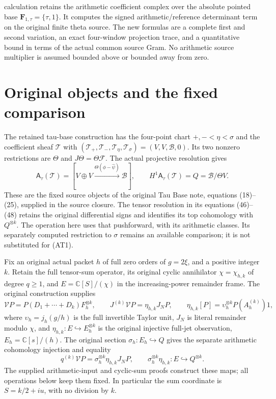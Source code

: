 \documentclass{article}
\newcommand{\C}{\mathbb C}
\begin{document}
\maketitleThis calculation retains the arithmetic coefficient complex over the
absolute pointed base $\mathbf F_{1,\tau}=\{\tau,1\}$. It computes the
signed arithmetic/reference determinant term on the original finite
theta source. The new formulas are a complete first and second variation,
an exact four-window projection trace, and a quantitative bound in terms
of the actual common source Gram. No arithmetic source multiplier is
assumed bounded above or bounded away from zero.

\section{Original objects and the fixed comparison}

The retained tau-base construction has the four-point chart
$+,-<\eta<\sigma$ and the coefficient sheaf $\mathcal T$ with
$(\mathcal T_+,\mathcal T_-,\mathcal T_\eta,\mathcal T_\sigma)
=(V,V,\mathscr B,0)$. Its two nonzero restrictions are $\Theta$ and
$J\Theta=\Theta\mathcal F$. The actual projective resolution gives
\[
 \mathsf A_\tau(\mathcal T)
 =[V\oplus V\xrightarrow{\Theta(\phi-\widehat\psi)}\mathscr B],
 \qquad H^1\mathsf A_\tau(\mathcal T)=Q=\mathscr B/\Theta V.
 \tag{AT1}
\]
These are the fixed source objects of the original Tau Base note,
equations (18)--(25), supplied in the source closure. The tensor
resolution in its equations (46)--(48) retains the original differential
signs and identifies its top cohomology with $Q^{\otimes k}$.
The operation here uses that pushforward, with its arithmetic classes.
Its separately computed restriction to $\sigma$ remains an available
comparison; it is not substituted for (AT1).

Fix an original actual packet $h$ of full zero orders of $g=2\xi$,
and a positive integer $k$. Retain the full tensor-sum operator,
its original cyclic annihilator $\chi=\chi_{h,k}$ of degree $q\ge1$,
and $E=\C[S]/(\chi)$ in the increasing-power remainder frame.
The original construction supplies
\[
 \mathcal V P=P(D_1+\cdots+D_k)F_h^{\otimes k},\qquad
 J^{(k)}\mathcal V P=\eta_{h,k}J_NP,\qquad
 \eta_{h,k}[P]=\upsilon_h^{\otimes k}P(A_h^{(k)})1,
 \tag{AT2}
\]
where $\upsilon_h=j_h(g/h)$ is the full invertible Taylor unit,
$J_N$ is literal remainder modulo $\chi$, and
$\eta_{h,k}:E\hookrightarrow E_h^{\otimes k}$ is the original
injective full-jet observation, $E_h=\C[s]/(h)$.
The original section $\sigma_h:E_h\hookrightarrow Q$ gives the
separate arithmetic cohomology injection and equality
\[
 q^{(k)}\mathcal V P=\sigma_h^{\otimes k}\eta_{h,k}J_NP,
 \qquad \sigma_h^{\otimes k}\eta_{h,k}:E\hookrightarrow Q^{\otimes k}.
 \tag{AT2a}
\]
The supplied arithmetic-input and cyclic-sum proofs construct these
maps; all operations below keep them fixed. In
particular the sum coordinate is $S=k/2+iu$, with no division by $k$.
\end{document}
